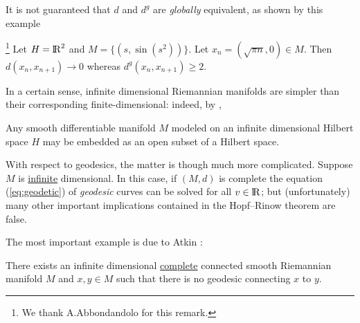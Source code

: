 \documentclass[twoside,a4paper,english]{article}
\begin{document}
It is not guaranteed that $d$ and $d^g$ are \emph{globally} equivalent,
as shown by this example
\begin{Example}
  \footnote{We thank A.Abbondandolo for this remark.}
  Let $H={\protect\mathrm{l\hskip-0.15em R}}^2$ and   $ M= \{ (s,\sin(s^2)) \}$.
  Let $x_n=(\sqrt{\pi n}, 0)\in M$. Then $d(x_n,x_{n+1})\to 0$ whereas
  $d^g(x_n,x_{n+1})\ge 2$.
\end{Example}



In a certain sense,  infinite dimensional Riemannian
manifolds are simpler than their corresponding
finite-dimensional: indeed, by \cite{EellsElworthy},
\begin{Theorem}\label{EellsElworthy}
  Any smooth differentiable manifold $M$ modeled on an 
  infinite dimensional Hilbert space $H$
  may be embedded as an open subset of a Hilbert space.
\end{Theorem}

With respect to geodesics, the matter is though much more complicated.
Suppose $M$ is \underline{infinite}
dimensional. In this case, 
if  $(M,d)$ is complete 
the  equation (\ref{eq:geodetic}) of \emph{geodesic} curves 
can be solved  for all $v\in{\protect\mathrm{l\hskip-0.15em R}}$;
but (unfortunately) many other important implications
contained in the Hopf--Rinow theorem are false.

The most important example is due to Atkin
\cite{atkin75}:
\begin{Example}[Atkin] There exists an infinite dimensional 
  \underline{complete} connected
  smooth Riemannian manifold $M$ and $x,y\in M$ such that there is no geodesic
  connecting $x$ to $y$.
\end{Example}
\end{document}
